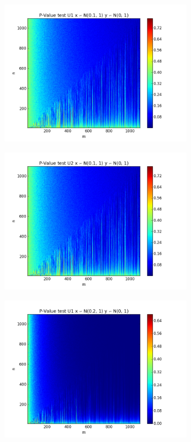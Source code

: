 \documentclass[%
 reprint,
 amsmath,amssymb,
 aps,
spanish]{revtex4-1}
\begin{document}
\begin{figure}[t]
    \centering
    \begin{subfigure}[t]{0.45\textwidth}
      \centering
      \includegraphics[width=0.9\textwidth]{imagenes/U1_01}
    \end{subfigure}
    \begin{subfigure}[t]{0.45\textwidth}
      \centering
      \includegraphics[width=0.9\textwidth]{imagenes/U2_01}
    \end{subfigure}
    \begin{subfigure}[t]{0.45\textwidth}
      \centering
      \includegraphics[width=0.9\textwidth]{imagenes/U1_02}

\end{subfigure}
\end{figure}
\end{document}
